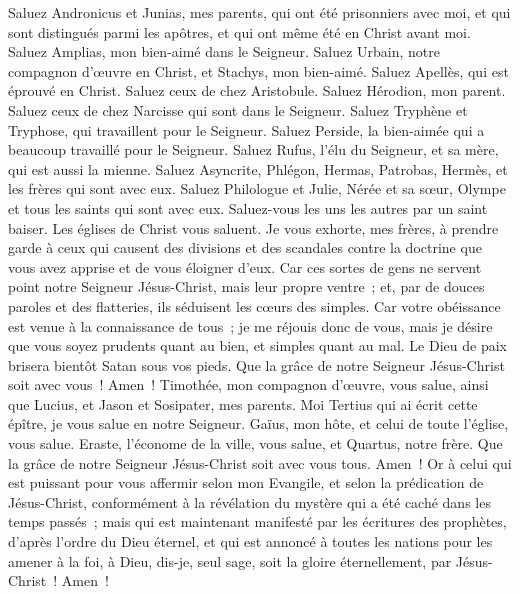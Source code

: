 \begin{multicols}{2}
Saluez Andronicus et Junias, mes parents, qui ont été prisonniers avec moi, et qui sont distingués parmi les apôtres, et qui ont même été en Christ avant moi.
Saluez Amplias, mon bien-aimé dans le Seigneur.
Saluez Urbain, notre compagnon d'œuvre en Christ, et Stachys, mon bien-aimé.
Saluez Apellès, qui est éprouvé en Christ. Saluez ceux de chez Aristobule.
Saluez Hérodion, mon parent. Saluez ceux de chez Narcisse qui sont dans le Seigneur.
Saluez Tryphène et Tryphose, qui travaillent pour le Seigneur. Saluez Perside, la bien-aimée qui a beaucoup travaillé pour le Seigneur.
Saluez Rufus, l'élu du Seigneur, et sa mère, qui est aussi la mienne.
Saluez Asyncrite, Phlégon, Hermas, Patrobas, Hermès, et les frères qui sont avec eux.
Saluez Philologue et Julie, Nérée et sa sœur, Olympe et tous les saints qui sont avec eux.
Saluez-vous les uns les autres par un saint baiser. Les églises de Christ vous saluent.
Je vous exhorte, mes frères, à prendre garde à ceux qui causent des divisions et des scandales contre la doctrine que vous avez apprise et de vous éloigner d'eux.
Car ces sortes de gens ne servent point notre Seigneur Jésus-Christ, mais leur propre ventre~; et, par de douces paroles et des flatteries, ils séduisent les cœurs des simples.
Car votre obéissance est venue à la connaissance de tous~; je me réjouis donc de vous, mais je désire que vous soyez prudents quant au bien, et simples quant au mal.
Le Dieu de paix brisera bientôt Satan sous vos pieds. Que la grâce de notre Seigneur Jésus-Christ soit avec vous~! Amen~!
Timothée, mon compagnon d'œuvre, vous salue, ainsi que Lucius, et Jason et Sosipater, mes parents.
Moi Tertius qui ai écrit cette épître, je vous salue en notre Seigneur.
Gaïus, mon hôte, et celui de toute l'église, vous salue. Eraste, l'économe de la ville, vous salue, et Quartus, notre frère.
Que la grâce de notre Seigneur Jésus-Christ soit avec vous tous. Amen~!
Or à celui qui est puissant pour vous affermir selon mon Evangile, et selon la prédication de Jésus-Christ, conformément à la révélation du mystère qui a été caché dans les temps passés~;
mais qui est maintenant manifesté par les écritures des prophètes, d'après l'ordre du Dieu éternel, et qui est annoncé à toutes les nations pour les amener à la foi,
à Dieu, dis-je, seul sage, soit la gloire éternellement, par Jésus-Christ~! Amen~!
\PPE{}
\end{multicols}

